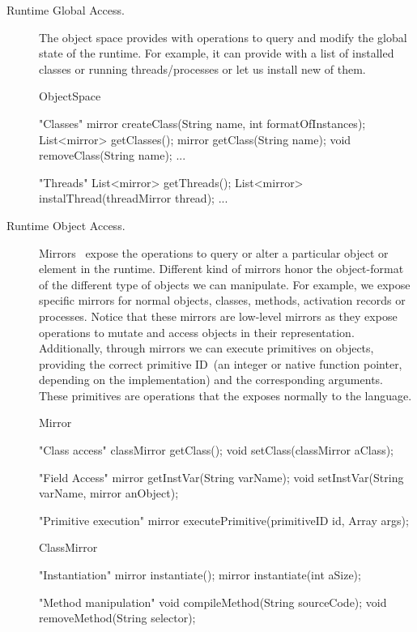 \begin{description}
\item[Runtime Global Access.] The object space provides with operations to query and modify the global state of the runtime. For example, it can provide with a list of installed classes or running threads/processes or let us install new of them.
\begin{code}
ObjectSpace {
    "Classes"
    mirror createClass(String name, int formatOfInstances);
    List<mirror> getClasses();
    mirror getClass(String name);
    void removeClass(String name);
    ...

    "Threads"
    List<mirror> getThreads();
    List<mirror> instalThread(threadMirror thread);
    ...
}
\end{code}

\item[Runtime Object Access.] Mirrors~\cite{Brac04b} expose the operations to query or alter a particular object or element in the runtime. Different kind of mirrors honor the object-format of the different type of objects we can manipulate. For example, we expose specific mirrors for normal objects, classes, methods, activation records or processes. Notice that these mirrors are low-level mirrors as they expose operations to mutate and access objects in their \VM representation. Additionally, through mirrors we can execute \VM primitives on objects, providing the correct primitive ID~(an integer or native function pointer, depending on the implementation) and the corresponding arguments. These primitives are operations that the \VM exposes normally to the language.

\begin{code}
Mirror {
    "Class access"
    classMirror getClass();
    void setClass(classMirror aClass);

    "Field Access"
    mirror getInstVar(String varName);
    void setInstVar(String varName, mirror anObject);
    
    "Primitive execution"
    mirror executePrimitive(primitiveID id, Array args);
}

ClassMirror {
    "Instantiation"
    mirror instantiate();
    mirror instantiate(int aSize);

    "Method manipulation"    
    void compileMethod(String sourceCode);
    void removeMethod(String selector);
}
\end{code}

\end{description}

